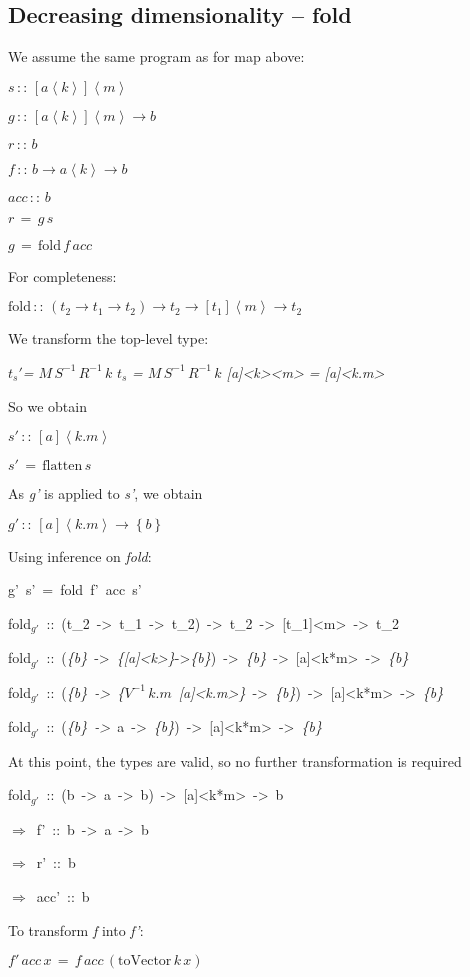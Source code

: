 \documentclass{article}
\newenvironment{lyxcode}
{\par\begin{list}{}{
\setlength{\rightmargin}{\leftmargin}
\setlength{\listparindent}{0pt}\raggedright
\setlength{\itemsep}{0pt}
\setlength{\parsep}{0pt}
\normalfont\ttfamily}\item[]}
{\end{list}}
\begin{document}
\subsection{Decreasing dimensionality -- fold}

We assume the same program as for map above:
\begin{lyxcode}
$s\,::\,[a\left\langle k\right\rangle ]\left\langle m\right\rangle $

$g\,::\,[a\left\langle k\right\rangle ]\left\langle m\right\rangle \rightarrow b$

$r\,::\, b$

$f\,::\, b\rightarrow a\left\langle k\right\rangle \rightarrow b$

$acc\,::\, b$

$r\,=\, g\, s$

$g\,=\,\mbox{fold}\, f\, acc$
\end{lyxcode}
For completeness:
\begin{lyxcode}
$\mbox{fold}\,::\,(t_{2}\rightarrow t_{1}\rightarrow t_{2})\rightarrow t_{2}\rightarrow[t_{1}]\left\langle m\right\rangle \rightarrow t_{2}$
\end{lyxcode}
We transform the top-level type:

$t_{s}'$\emph{= $M\, S^{-1}\, R^{-1}\, k$ }$t_{s}$ \emph{= $M\, S^{-1}\, R^{-1}\, k$
{[}a{]}<k><m> = {[}a{]}<k.m>}

So we obtain
\begin{lyxcode}
$s'\,::\,[a]\left\langle k.m\right\rangle $

$s'\,=\,\mbox{flatten}\, s$
\end{lyxcode}
As \emph{g'} is applied to \emph{s'}, we obtain 
\begin{lyxcode}
$g'\,::\,[a]\left\langle k.m\right\rangle \rightarrow\left\{ b\right\} $
\end{lyxcode}
Using inference on \emph{fold}:
\begin{lyxcode}
g'~s'~=~fold~f'~acc~s'

fold$_{g'}$~::~(t\_2~->~t\_1~->~t\_2)~->~t\_2~->~{[}t\_1{]}<m>~->~t\_2

fold$_{g'}$~::~(\emph{\{b\}}~->~\emph{\{{[}a{]}<k>\}}->\emph{\{b\}})~->~\emph{\{b\}}~->~{[}a{]}<k{*}m>~->~\emph{\{b\}}

fold$_{g'}$~::~(\emph{\{b\}~->~\{}$V^{-1}\, k.m$~\emph{{[}a{]}<k.m>\}}~->~\emph{\{b\}})~->~{[}a{]}<k{*}m>~->~\emph{\{b\}}

fold$_{g'}$~::~(\emph{\{b\}~->}~a~->~\emph{\{b\}})~->~{[}a{]}<k{*}m>~->~\emph{\{b\}}
\end{lyxcode}
At this point, the types are valid, so no further transformation is
required
\begin{lyxcode}
fold$_{g'}$~::~(b~->~a~->~b)~->~{[}a{]}<k{*}m>~->~b

$\Rightarrow$~f'~::~b~->~a~->~b

$\Rightarrow$~r'~::~b

$\Rightarrow$~acc'~::~b
\end{lyxcode}
To transform \emph{f} into \emph{f'}:
\begin{lyxcode}
$f'\, acc\, x\,=\, f\, acc\,\left(\mbox{toVector}\, k\, x\right)$
\end{lyxcode}
\end{document}
